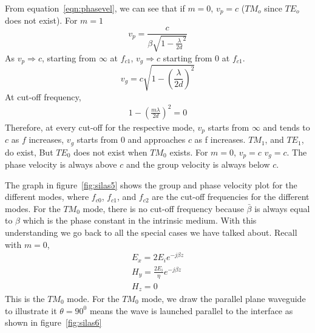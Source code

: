 From equation~\ref{eqn:phasevel}, we can see that if $m=0$, $v_{p} =c$ ($TM_o$ since $TE_o$ does not exist). For $m=1$
\begin{equation*}
v_{p}= \frac{c}{\beta \sqrt{1- \frac{\lambda}{2d}^{2}}}
\end{equation*}
As $v_{p} \Rightarrow c$, starting from $\infty$ at $f_{c1}$, $v_{g} \Rightarrow c$ starting from 0 at $f_{c1}$.
\begin{equation*}
v_{g}= c\sqrt{1-\left(\frac{\lambda}{2d}\right)^{2}}
\end{equation*}
At cut-off frequency, 
\begin{align*}
1-\left(\frac{m\lambda}{2d}\right)^{2} = 0
\end{align*}
Therefore, at every cut-off for the respective mode, $v_{p}$ starts from $\infty$ and tends to $c$ as $f$ increases, $v_{g}$ starts from 0 and approaches $c$ as f increases. $TM_{1}$, and $TE_{1}$, do exist, But $TE_0$ does not exist when $TM_0$ exists. For $m = 0$, $v_{p}=c$ $v_{g}=c$. The phase velocity is always above $c$ and the group velocity is always below $c$.

The graph in figure~\ref{fig:silas5} shows the group and phase velocity plot for the different modes, where $f_{c0}$, $f_{c1}$, and $f_{c2}$ are the cut-off frequencies for the different modes. For the $TM_0$ mode, there is no cut-off frequency because $\bar{\beta}$ is always equal to $\beta$ which is the phase constant in the intrinsic medium. With this understanding we go back to all the special cases we have talked about. Recall with $m = 0$, 
\begin{align*}
E_{x} =2E_{i} e^{-j\beta z}\\
H_{y} = \frac{2E_{i}}{\eta} e^{-j\beta z}\\
H_{z} =0
\end{align*}
This is the $TM_0$ mode. For the $TM_0$ mode, we draw the parallel plane waveguide to illustrate it $\theta =90^{0}$ means the wave is launched parallel to the interface as shown in figure~\ref{fig:silas6}

